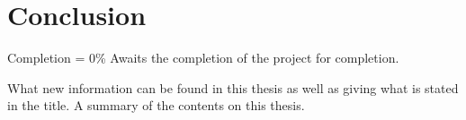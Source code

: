 \chapter{Conclusion}

Completion = 0\%
Awaits the completion of the project for completion.

What new information can be found in this thesis as well as giving what is stated in the title. A summary of the contents on this thesis.